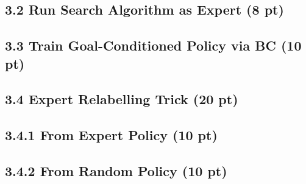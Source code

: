 \documentclass[12pt]{article}
\begin{document}
\subsection*{3.2 Run Search Algorithm as Expert (8 pt)}

\begin{tcolorbox}[fit,height=30em, width=40em, blank, borderline={1pt}{1pt},nobeforeafter]
\begin{center}

\end{center}
\end{tcolorbox}



\subsection*{3.3 Train Goal-Conditioned Policy via BC (10 pt)}

\begin{tcolorbox}[fit,height=22em, width=40em, blank, borderline={1pt}{1pt},nobeforeafter]
\begin{center}

\end{center}
\end{tcolorbox}




\subsection*{3.4 Expert Relabelling Trick (20 pt)}
\subsection*{3.4.1 From Expert Policy (10 pt)}

\begin{tcolorbox}[fit,height=22em, width=40em, blank, borderline={1pt}{1pt},nobeforeafter]
\begin{center}

\end{center}
\end{tcolorbox}


\subsection*{3.4.2 From Random Policy (10 pt)}

\begin{tcolorbox}[fit,height=50em, width=40em, blank, borderline={1pt}{1pt},nobeforeafter]
\begin{center}

\end{center}
\end{tcolorbox}
\end{document}

